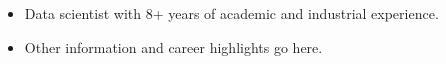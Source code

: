 %
%
%
\par{
\begin{itemize}
    \item Data scientist with 8+ years of academic and industrial experience.
    \item Other information and career highlights go here.
\end{itemize}
}